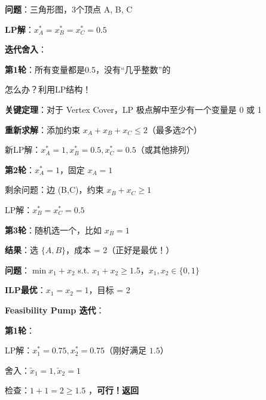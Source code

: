 \documentclass[12pt, a4paper]{ctexart}
\begin{document}
\begin{blackboard}

\textbf{问题}：三角形图，3个顶点 A, B, C

\textbf{LP解}：$x_A^* = x_B^* = x_C^* = 0.5$

\textbf{迭代舍入}：

\textbf{第1轮}：所有变量都是0.5，没有``几乎整数''的

怎么办？利用LP结构！

\textbf{关键定理}：对于 Vertex Cover，LP 极点解中至少有一个变量是 0 或 1

\textbf{重新求解}：添加约束 $x_A + x_B + x_C \leq 2$（最多选2个）

新LP解：$x_A^* = 1, x_B^* = 0.5, x_C^* = 0.5$（或其他排列）

\textbf{第2轮}：$x_A^* = 1$，固定 $x_A = 1$

剩余问题：边 (B,C)，约束 $x_B + x_C \geq 1$

LP解：$x_B^* = x_C^* = 0.5$

\textbf{第3轮}：随机选一个，比如 $x_B = 1$

\textbf{结果}：选 $\{A, B\}$，成本 = 2（正好是最优！）

\end{blackboard}

\begin{blackboard}

\textbf{问题}：$\min x_1 + x_2$ s.t. $x_1 + x_2 \geq 1.5$，$x_1, x_2 \in \{0,1\}$

\textbf{ILP最优}：$x_1 = x_2 = 1$，目标 = 2

\textbf{Feasibility Pump 迭代}：

\textbf{第1轮}：

LP解：$x_1^* = 0.75, x_2^* = 0.75$（刚好满足 $1.5$）

舍入：$\tilde{x}_1 = 1, \tilde{x}_2 = 1$

检查：$1 + 1 = 2 \geq 1.5$ \checkmark，\textbf{可行！返回}

\end{blackboard}
\end{document}
